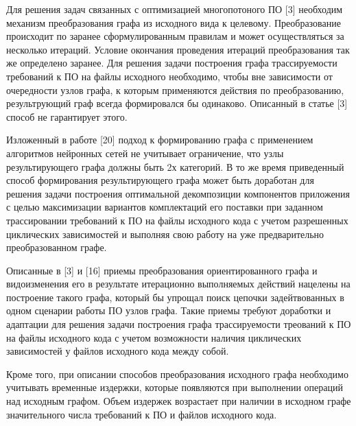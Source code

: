 Для решения задач связанных с оптимизацией многопотоного ПО [3] необходим механизм преобразования графа из исходного вида к целевому. Преобразование происходит по заранее сформулированным правилам и может осуществляться за несколько итераций. Условие окончания проведения итераций преобразования так же определено заранее. Для решения задачи построения графа трассируемости требований к ПО на файлы исходного необходимо, чтобы вне зависимости от очередности узлов графа, к которым применяются действия по преобразованию, результрующий граф всегда формировался бы одинаково. Описанный в статье [3] способ не гарантирует этого. 

Изложенный в работе [20] подход к формированию графа с применением алгоритмов нейронных сетей не учитывает ограничение, что узлы результирующего графа должны быть 2х категорий. В то же время приведенный способ формирования результирующего графа может быть доработан для решения задачи построения оптимальной декомпозиции компонентов приложения с целью максимизации вариантов комплектаций его поставки при заданном трассировании требований к ПО на файлы исходного кода с учетом разрешенных циклических зависимостей и выполняя свою работу на уже предварительно преобразованном графе.

Описанные в [3] и [16] приемы преобразования ориентированного графа и видоизменения его в результате итерационно выполняемых действий нацелены на построение такого графа, который бы упрощал поиск цепочки задейтвованных в одном сценарии работы ПО узлов графа. Такие приемы требуют доработки и адаптации для решения задачи построения графа трассируемости треований к ПО на файлы исходного кода с учетом возможности наличия циклических зависимостей у файлов исходного кода между собой.

Кроме того, при описании способов преобразования исходного графа необходимо учитывать временные издержки, которые появляются при выполнении операций над исходным графом. Объем издержек возрастает при наличии в исходном графе значительного числа требований к ПО и файлов исходного кода.
